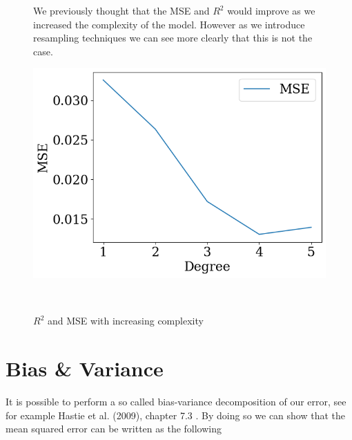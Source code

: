 \documentclass[twoside,11pt]{report}
\begin{document}
\begin{figure}[h]
\begin{minipage}[!t]{.48\linewidth}
    We previously thought that the MSE and $R^2$ would improve as we increased the complexity of the model. However
as we introduce resampling techniques we can see more clearly that this is not the case. 
\end{minipage}
\hspace{4mm}
\begin{minipage}[!t]{.48\linewidth}
    \begin{center}
        \includegraphics[width=1.0\textwidth]{../runsAndAdditions/R2andMSEOLSCrossval.png}
        \caption{$R^2$ and MSE with increasing complexity}\label{fig:R2andMSEOLSCrossval}
    \end{center}
\end{minipage}\\
\end{figure}





\section{Bias \& Variance}
\label{sec:biasvariance}

It is possible to perform a so called bias-variance decomposition of our error, 
see for example Hastie et al. (2009), chapter 7.3 \cite{hastie01statisticallearning}.
By doing so we can show that the mean squared error can be written as the following
\end{document}
